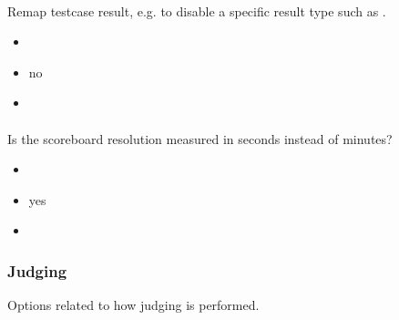 \documentclass[a4paper,10pt,english,openany]{sphinxmanual}
\begin{document}
\paragraph{}
\label{\detokenize{configuration-reference:results-remap}}
\sphinxAtStartPar
Remap testcase result, e.g. to disable a specific result type such as .
\begin{itemize}
\item {} 
\sphinxAtStartPar
{} 

\item {} 
\sphinxAtStartPar
{} no

\item {} 
\sphinxAtStartPar
{}

\begin{sphinxVerbatim}[commandchars=\\\{\}]
\end{sphinxVerbatim}

\end{itemize}


\paragraph{}
\label{\detokenize{configuration-reference:score-in-seconds}}
\sphinxAtStartPar
Is the scoreboard resolution measured in seconds instead of minutes?
\begin{itemize}
\item {} 
\sphinxAtStartPar
{} 

\item {} 
\sphinxAtStartPar
{} yes

\item {} 
\sphinxAtStartPar
{} 

\end{itemize}


\subsubsection{Judging}
\label{\detokenize{configuration-reference:judging}}
\sphinxAtStartPar
Options related to how judging is performed.
\end{document}
